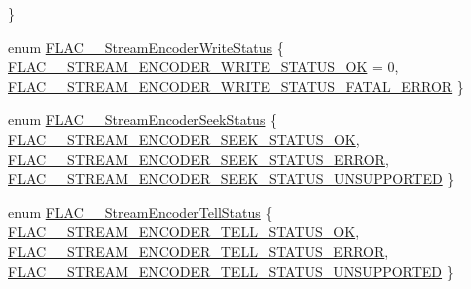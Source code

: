 \begin{DoxyCompactItemize}
 \}
\item 
enum \hyperlink{group__flac__stream__encoder_ga3737471fd49730bb8cf9b182bdeda05e}{F\+L\+A\+C\+\_\+\+\_\+\+Stream\+Encoder\+Write\+Status} \{ \hyperlink{group__flac__stream__encoder_gga3737471fd49730bb8cf9b182bdeda05ea5622e0199f0203c402fcb7b4ca76f808}{F\+L\+A\+C\+\_\+\+\_\+\+S\+T\+R\+E\+A\+M\+\_\+\+E\+N\+C\+O\+D\+E\+R\+\_\+\+W\+R\+I\+T\+E\+\_\+\+S\+T\+A\+T\+U\+S\+\_\+\+OK} = 0, 
\hyperlink{group__flac__stream__encoder_gga3737471fd49730bb8cf9b182bdeda05ea18e7cd6a443fb8bd303c3ba89946bc85}{F\+L\+A\+C\+\_\+\+\_\+\+S\+T\+R\+E\+A\+M\+\_\+\+E\+N\+C\+O\+D\+E\+R\+\_\+\+W\+R\+I\+T\+E\+\_\+\+S\+T\+A\+T\+U\+S\+\_\+\+F\+A\+T\+A\+L\+\_\+\+E\+R\+R\+OR}
 \}
\item 
enum \hyperlink{group__flac__stream__encoder_ga6d5be3489f45fcf0c252022c65d87aca}{F\+L\+A\+C\+\_\+\+\_\+\+Stream\+Encoder\+Seek\+Status} \{ \hyperlink{group__flac__stream__encoder_gga6d5be3489f45fcf0c252022c65d87acaa99853066610d798627888ec2e5afa667}{F\+L\+A\+C\+\_\+\+\_\+\+S\+T\+R\+E\+A\+M\+\_\+\+E\+N\+C\+O\+D\+E\+R\+\_\+\+S\+E\+E\+K\+\_\+\+S\+T\+A\+T\+U\+S\+\_\+\+OK}, 
\hyperlink{group__flac__stream__encoder_gga6d5be3489f45fcf0c252022c65d87acaabf93227938b4e1bf3656fe4ba4159c60}{F\+L\+A\+C\+\_\+\+\_\+\+S\+T\+R\+E\+A\+M\+\_\+\+E\+N\+C\+O\+D\+E\+R\+\_\+\+S\+E\+E\+K\+\_\+\+S\+T\+A\+T\+U\+S\+\_\+\+E\+R\+R\+OR}, 
\hyperlink{group__flac__stream__encoder_gga6d5be3489f45fcf0c252022c65d87acaa8930179a426134caf30a70147448f037}{F\+L\+A\+C\+\_\+\+\_\+\+S\+T\+R\+E\+A\+M\+\_\+\+E\+N\+C\+O\+D\+E\+R\+\_\+\+S\+E\+E\+K\+\_\+\+S\+T\+A\+T\+U\+S\+\_\+\+U\+N\+S\+U\+P\+P\+O\+R\+T\+ED}
 \}
\item 
enum \hyperlink{group__flac__stream__encoder_gab628f63181250eb977a28bf12b7dd9ff}{F\+L\+A\+C\+\_\+\+\_\+\+Stream\+Encoder\+Tell\+Status} \{ \hyperlink{group__flac__stream__encoder_ggab628f63181250eb977a28bf12b7dd9ffa48e071d89494ac8f5471e7c0d7a6f43b}{F\+L\+A\+C\+\_\+\+\_\+\+S\+T\+R\+E\+A\+M\+\_\+\+E\+N\+C\+O\+D\+E\+R\+\_\+\+T\+E\+L\+L\+\_\+\+S\+T\+A\+T\+U\+S\+\_\+\+OK}, 
\hyperlink{group__flac__stream__encoder_ggab628f63181250eb977a28bf12b7dd9ffaf638882e04d7c58e6c29dcc7f410864b}{F\+L\+A\+C\+\_\+\+\_\+\+S\+T\+R\+E\+A\+M\+\_\+\+E\+N\+C\+O\+D\+E\+R\+\_\+\+T\+E\+L\+L\+\_\+\+S\+T\+A\+T\+U\+S\+\_\+\+E\+R\+R\+OR}, 
\hyperlink{group__flac__stream__encoder_ggab628f63181250eb977a28bf12b7dd9ffa9d6bbd317f85fd2d6fc72f64e3cb56e7}{F\+L\+A\+C\+\_\+\+\_\+\+S\+T\+R\+E\+A\+M\+\_\+\+E\+N\+C\+O\+D\+E\+R\+\_\+\+T\+E\+L\+L\+\_\+\+S\+T\+A\+T\+U\+S\+\_\+\+U\+N\+S\+U\+P\+P\+O\+R\+T\+ED}
 \}
\end{DoxyCompactItemize}
